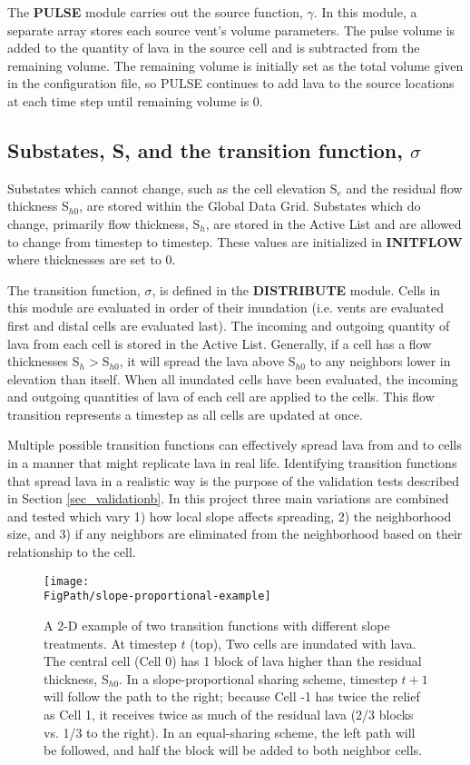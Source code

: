 		The \textbf{PULSE} module carries out the source function, $\gamma$. In this module, a separate array stores each source vent's volume parameters. The pulse volume is added to the quantity of lava in the source cell and is subtracted from the remaining volume. The remaining volume is initially set as the total volume given in the configuration file, so PULSE continues to add lava to the source locations at each time step until remaining volume is 0.
		
	\subsection{Substates, S, and the transition function, $\sigma$}
		Substates which cannot change, such as the cell elevation S$_e$ and the residual flow thickness S$_{h0}$, are stored within the Global Data Grid. Substates which do change, primarily flow thickness, S$_h$, are stored in the Active List and are allowed to change from timestep to timestep. These values are initialized in \textbf{INITFLOW} where thicknesses are set to 0.
		
		The transition function, $\sigma$, is defined in the \textbf{DISTRIBUTE} module. Cells in this module are evaluated in order of their inundation (i.e. vents are evaluated first and distal cells are evaluated last). The incoming and outgoing quantity of lava from each cell is stored in the Active List. Generally, if a cell has a flow thicknesses S$_h>$S$_{h0}$, it will spread the lava above S$_{h0}$ to any neighbors lower in elevation than itself. When all inundated cells have been evaluated, the incoming and outgoing quantities of lava of each cell are applied to the cells. This flow transition represents a timestep as all cells are updated at once.
		
		Multiple possible transition functions can effectively spread lava from and to cells in a manner that might replicate lava in real life. Identifying transition functions that spread lava in a realistic way is the purpose of the validation tests described in Section \ref{sec_validationb}. In this project three main variations are combined and tested which vary 1) how local slope affects spreading, 2) the neighborhood size, and 3) if any neighbors are eliminated from the neighborhood based on their relationship to the cell.
		
		\begin{figure}[!h]
			\centering
			\texttt{[image: \\FigPath/slope-proportional-example]}
			\caption[A 2-D example of two transition functions with different slope treatments]{A 2-D example of two transition functions with different slope treatments. At timestep $t$ (top), Two cells are inundated with lava. The central cell (Cell 0) has 1 block of lava higher than the residual thickness, S$_{h0}$. In a slope-proportional sharing scheme, timestep $t+1$ will follow the path to the right; because Cell -1 has twice the relief as Cell 1, it receives twice as much of the residual lava (2/3 blocks vs. 1/3 to the right). In an equal-sharing scheme, the left path will be followed, and half the block will be added to both neighbor cells.}
			\label{fig_BernieSanders}
		\end{figure}
		
